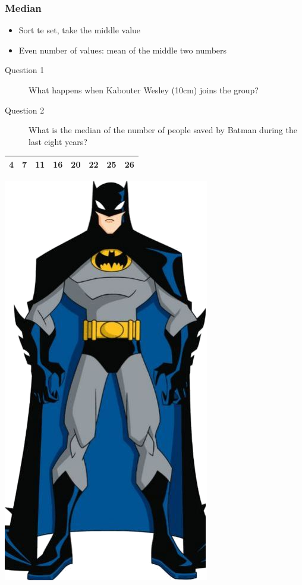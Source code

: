 \documentclass{beamer}
\begin{document}
\begin{frame}
  \frametitle{Median}


  \begin{itemize}
    \item Sort te set, take the middle value
    \item Even number of values: mean of the middle two numbers
  \end{itemize}

  

  \pause

  \begin{description}
    \item[Question 1] What happens when Kabouter Wesley (10cm) joins the group?
    \item[Question 2] What is the median of the number of people saved by Batman during the last eight years?
  \end{description}

    \centering
    \begin{tabular}{|c|c|c|c|c|c|c|c|}
      \hline
      4 & 7 & 11 & 16 & 20 & 22 & 25 & 26 \\
      \hline
    \end{tabular}
    \includegraphics[width=.6cm]{img/les2-hero-2}
\end{frame}
\end{document}

